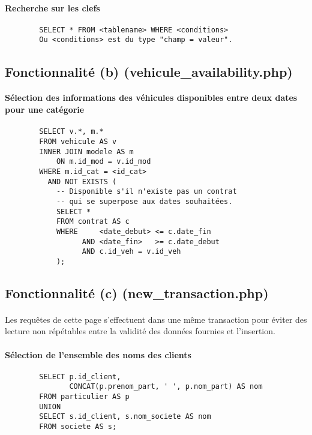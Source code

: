 \documentclass[a4paper]{article}
\begin{document}
    \paragraph{Recherche sur les clefs}
    \begin{verbatim}
        SELECT * FROM <tablename> WHERE <conditions>
        Ou <conditions> est du type "champ = valeur".
    \end{verbatim}

  \subsection{Fonctionnalité (b) (vehicule\_availability.php)}

    \paragraph{Sélection des informations des véhicules disponibles entre deux
    dates pour une catégorie}
    \begin{verbatim}
        SELECT v.*, m.*
        FROM vehicule AS v
        INNER JOIN modele AS m
            ON m.id_mod = v.id_mod
        WHERE m.id_cat = <id_cat>
          AND NOT EXISTS (
            -- Disponible s'il n'existe pas un contrat
            -- qui se superpose aux dates souhaitées.
            SELECT *
            FROM contrat AS c
            WHERE     <date_debut> <= c.date_fin
                  AND <date_fin>   >= c.date_debut
                  AND c.id_veh = v.id_veh
            );
    \end{verbatim}

  \subsection{Fonctionnalité (c) (new\_transaction.php)}

    \paragraph{}Les requêtes de cette page s'effectuent dans une même
transaction pour éviter des lecture non répétables entre la validité des
données fournies et l'insertion.

    \paragraph{Sélection de l'ensemble des noms des clients}
    \begin{verbatim}
        SELECT p.id_client,
               CONCAT(p.prenom_part, ' ', p.nom_part) AS nom
        FROM particulier AS p
        UNION
        SELECT s.id_client, s.nom_societe AS nom
        FROM societe AS s;
    \end{verbatim}
\end{document}
